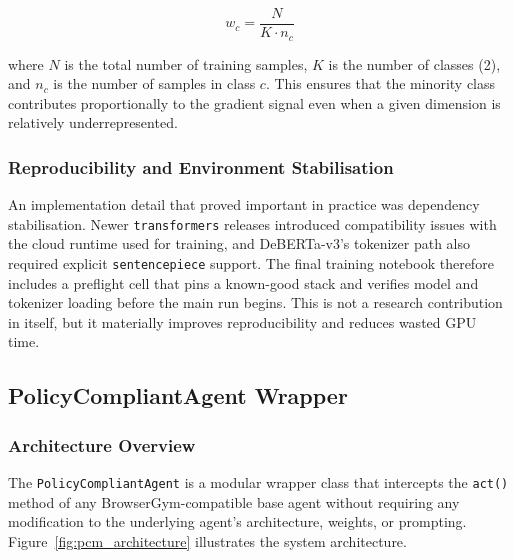 \documentclass[12pt,a4paper]{article}
\begin{document}
\begin{equation}
  w_c = \frac{N}{K \cdot n_c}
\end{equation}

where $N$ is the total number of training samples, $K$ is the number of classes
(2), and $n_c$ is the number of samples in class $c$. This ensures that the
minority class contributes proportionally to the gradient signal even when a
given dimension is relatively underrepresented.

\subsubsection{Reproducibility and Environment Stabilisation}

An implementation detail that proved important in practice was dependency
stabilisation. Newer \texttt{transformers} releases introduced compatibility
issues with the cloud runtime used for training, and DeBERTa-v3's tokenizer path
also required explicit \texttt{sentencepiece} support. The final training
notebook therefore includes a preflight cell that pins a known-good stack and
verifies model and tokenizer loading before the main run begins. This is not a
research contribution in itself, but it materially improves reproducibility and
reduces wasted GPU time.

\subsection{PolicyCompliantAgent Wrapper}

\subsubsection{Architecture Overview}

The \texttt{PolicyCompliantAgent} is a modular wrapper class that intercepts the
\texttt{act()} method of any BrowserGym-compatible base agent without requiring
any modification to the underlying agent's architecture, weights, or prompting.
Figure~\ref{fig:pcm_architecture} illustrates the system architecture.
\end{document}
